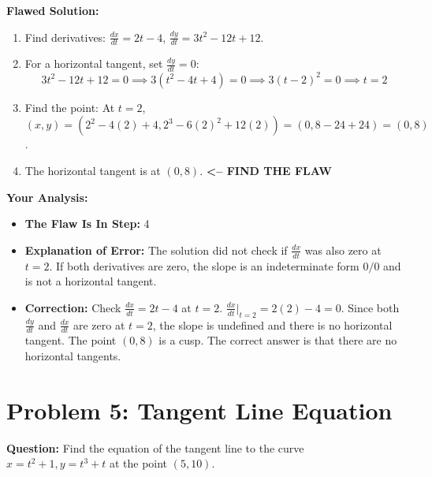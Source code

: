 \documentclass{article}
\begin{document}
\begin{itemize}
\begin{itemize}
\textbf{Flawed Solution:}
\begin{enumerate}
    \item Find derivatives: $\frac{dx}{dt} = 2t-4$, $\frac{dy}{dt} = 3t^2-12t+12$.
    \item For a horizontal tangent, set $\frac{dy}{dt} = 0$:
    \[ 3t^2-12t+12 = 0 \implies 3(t^2-4t+4)=0 \implies 3(t-2)^2=0 \implies t = 2 \]
    \item Find the point:
    At $t=2$, $(x,y) = (2^2-4(2)+4, 2^3-6(2)^2+12(2)) = (0, 8-24+24) = (0, 8)$.
    \item The horizontal tangent is at $(0, 8)$. \quad \longleftarrow \textbf{<-- FIND THE FLAW}
\end{enumerate}
\textbf{Your Analysis:}
\begin{itemize}
    \item \textbf{The Flaw Is In Step:} 4
    \item \textbf{Explanation of Error:} The solution did not check if $\frac{dx}{dt}$ was also zero at $t=2$. If both derivatives are zero, the slope is an indeterminate form $0/0$ and is not a horizontal tangent.
    \item \textbf{Correction:}
    Check $\frac{dx}{dt} = 2t-4$ at $t=2$. $\frac{dx}{dt}|_{t=2} = 2(2)-4 = 0$.
    Since both $\frac{dy}{dt}$ and $\frac{dx}{dt}$ are zero at $t=2$, the slope is undefined and there is no horizontal tangent. The point $(0,8)$ is a cusp. The correct answer is that there are no horizontal tangents.
\end{itemize}

\section{Problem 5: Tangent Line Equation}
\textbf{Question:} Find the equation of the tangent line to the curve $x=t^2+1, y=t^3+t$ at the point $(5, 10)$.


\end{itemize}
\end{itemize}
\end{document}
